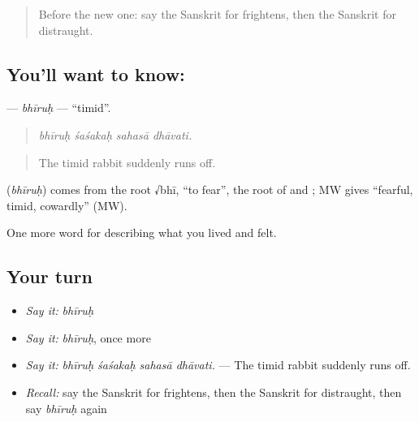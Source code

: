 \label{lesson:SA-C463-bhiruh}



\begin{quote}
Before the new one: say the Sanskrit for frightens, then the Sanskrit for distraught.
\end{quote}

\subsection*{You'll want to know: }
\textbf{} — \emph{bhīruḥ} — \textquotedblleft{}timid\textquotedblright{}.

\begin{quote}
   
\end{quote}

\begin{quote}
\emph{bhīruḥ śaśakaḥ sahasā dhāvati.}
\end{quote}

\begin{quote}
The timid rabbit suddenly runs off.
\end{quote}

\begin{cousinweb}
\textbf{} (\emph{bhīruḥ}) comes from the root √bhī, \textquotedblleft{}to fear\textquotedblright{}, the root of \textbf{} and \textbf{}; MW gives \textquotedblleft{}fearful, timid, cowardly\textquotedblright{} (MW).
\end{cousinweb}

\begin{grammarlens}[title={What you've built}]
One more word for describing what you lived and felt.
\end{grammarlens}

\subsection*{Your turn}
\begin{itemize}
\raggedright
  \item \emph{Say it:} \emph{bhīruḥ}
  \item \emph{Say it:} \emph{bhīruḥ}, once more
  \item \emph{Say it:} \emph{bhīruḥ śaśakaḥ sahasā dhāvati.} — The timid rabbit suddenly runs off.
  \item \emph{Recall:} say the Sanskrit for frightens, then the Sanskrit for distraught, then say \emph{bhīruḥ} again
\end{itemize}

